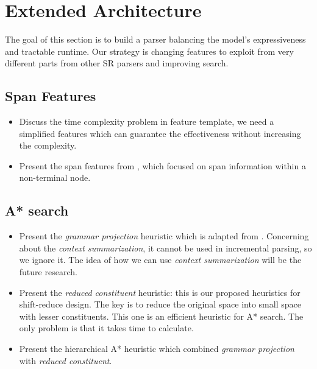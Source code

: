 \section{Extended Architecture}
	The goal of this section is to build a parser balancing the model's expressiveness and tractable runtime. Our strategy is changing features to exploit from very different parts from other SR parsers and improving search.
\subsection{Span Features}
	\begin{itemize}
		\item Discuss the time complexity problem in feature template, we need a simplified features which can guarantee the effectiveness without increasing the complexity.
		\item Present the span features from \cite{2014David}, which focused on span information within a non-terminal node.
	\end{itemize}
\subsection{A* search}
	\begin{itemize}
		\item Present the \textit{grammar projection} heuristic which is adapted from \cite{2003DanACL}. Concerning about the \textit{context summarization}, it cannot be used in incremental parsing, so we ignore it. The idea of how we can use \textit{context summarization} will be the future research.
		\item Present the \textit{reduced constituent} heuristic: this is our proposed heuristics for shift-reduce design. The key is to reduce the original space into small space with lesser constituents. This one is an efficient heuristic for A* search. The only problem is that it takes time to calculate.
		\item Present the hierarchical A* heuristic which combined \textit{grammar projection} with \textit{reduced constituent}.
	\end{itemize}
